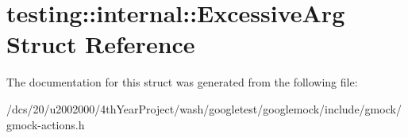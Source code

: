 \hypertarget{structtesting_1_1internal_1_1ExcessiveArg}{}\section{testing\+:\+:internal\+:\+:Excessive\+Arg Struct Reference}
\label{structtesting_1_1internal_1_1ExcessiveArg}


The documentation for this struct was generated from the following file\+:\begin{DoxyCompactItemize}
\item 
/dcs/20/u2002000/4th\+Year\+Project/wash/googletest/googlemock/include/gmock/gmock-\/actions.\+h\end{DoxyCompactItemize}

